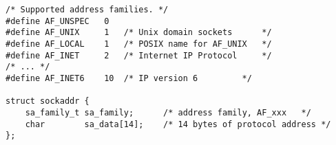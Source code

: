 
\begin{lstlisting}
/* Supported address families. */
#define AF_UNSPEC	0
#define AF_UNIX		1	/* Unix domain sockets 		*/
#define AF_LOCAL	1	/* POSIX name for AF_UNIX	*/
#define AF_INET		2	/* Internet IP Protocol 	*/
/* ... */
#define AF_INET6	10	/* IP version 6			*/

struct sockaddr {
	sa_family_t	sa_family;	    /* address family, AF_xxx	*/
	char		sa_data[14];	/* 14 bytes of protocol address	*/
};
\end{lstlisting}
